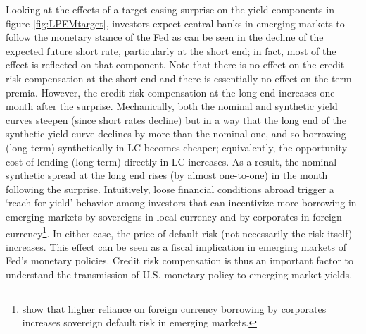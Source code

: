 {Looking at the effects of a target easing surprise on the yield components in figure \ref{fig:LPEMtarget}, investors expect central banks in emerging markets to follow the monetary stance of the Fed %
as can be seen in the decline of the expected future short rate, particularly at the short end; in fact, most of the effect is reflected on that component.
Note that there is no effect on the credit risk compensation at the short end and there is essentially no effect on the term premia. 
However, the credit risk compensation at the long end increases one month after the surprise.
Mechanically, both the nominal and synthetic yield curves steepen (since short rates decline) 
but in a way that the long end of the synthetic yield curve declines by more than the nominal one, 
and so borrowing (long-term) synthetically in LC becomes cheaper; equivalently, the opportunity cost of lending (long-term) directly in LC increases.
As a result, the nominal-synthetic spread at the long end rises (by almost one-to-one) in the month following the surprise.
Intuitively, loose financial conditions abroad trigger a `reach for yield' behavior among investors \citep{HausmanWongswan:2011} that can incentivize more borrowing in emerging markets by sovereigns in local currency \citep{BigioNunoPassadore:2018} and by corporates in foreign currency\footnote{\cite{DuSchreger:2017WP} show that higher reliance on foreign currency borrowing by corporates increases sovereign default risk in emerging markets.}.
In either case, the price of default risk (not necessarily the risk itself) increases. 
This effect can be seen as a fiscal implication in emerging markets of Fed's monetary policies. %
Credit risk compensation is thus an important factor to understand the transmission of U.S. monetary policy to emerging market yields.

}
